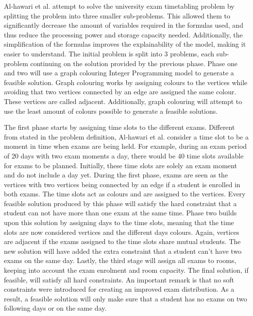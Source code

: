 Al-hawari et al. \cite{hawari2017} attempt to solve the university exam timetabling problem by splitting the problem into three smaller sub-problems. This allowed them to significantly decrease the amount of variables required in the formulas used, and thus reduce the processing power and storage capacity needed. Additionally, the simplification of the formulas improves the explainability of the model, making it easier to understand. The initial problem is split into 3 problems, each sub-problem continuing on the solution provided by the previous phase. Phase one and two will use a  graph colouring Integer Programming model to generate a feasible solution. Graph colouring works by assigning colours to the vertices while avoiding that two vertices connected by an edge are assigned the same colour. These vertices are called adjacent. Additionally, graph colouring will attempt to use the least amount of colours possible to generate a feasible solutions.

The first phase starts by assigning time slots to the different exams. Different from stated in the problem definition, Al-hawari et al. consider a time slot to be a moment in time when exams are being held. For example, during an exam period of 20 days with two exam moments a day, there would be 40 time slots available for exams to be planned. Initially, these time slots are solely an exam moment and do not include a day yet. During the first phase, exams are seen as the vertices with two vertices being connected by an edge if a student is enrolled in both exams. The time slots act as colours and are assigned to the vertices. Every feasible solution produced by this phase will satisfy the hard constraint that a student can not have more than one exam at the same time. Phase two builds upon this solution by assigning days to the time slots, meaning that the time slots are now considered vertices and the different days colours. Again, vertices are adjacent if the exams assigned to the time slots share mutual students. The new solution will have added the extra constraint that a student can't have two exams on the same day. Lastly, the third stage will assign all exams to rooms, keeping into account the exam enrolment and room capacity. The final solution, if feasible, will satisfy all hard constraints. An important remark is that no soft constraints were introduced for creating an improved exam distribution. As a result, a feasible solution will only make sure that a student has no exams on two following days or on the same day.


